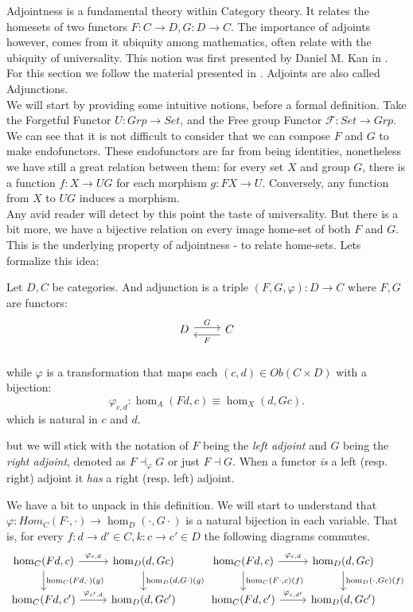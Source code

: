 Adjointness is a fundamental theory within Category theory. It relates the homesets of two functors $F:C\to D, G:D\to C$. The importance of adjoints however, comes from it ubiquity among mathematics, often relate with the ubiquity of universality. This notion was first presented by Daniel M. Kan in \cite{kan1958adjoint}. For this section we follow the material presented in \cite{mac2013categories}. Adjoints are also called Adjunctions.\\

We  will start by providing some intuitive notions, before a formal definition. Take the Forgetful Functor $U:Grp\to Set$, and the Free group Functor $\mathcal{F}:Set\to Grp$. We can see that it is not difficult to consider that we can compose $F$ and $G$ to make endofunctors. These endofunctors are far from being identities, nonetheless we have still a great relation between them: for every set $X$ and group $G$, there is a function $f: X \to UG$ for each morphism $g:FX\to U$. Conversely, any function from $X$ to $UG$ induces a morphism. \\

Any avid reader will detect by this point the taste of universality. But there is a bit more, we have a bijective relation on every image home-set of both $F$ and $G$. This is the underlying property of adjointness - to relate home-sets. Lets formalize this idea:
\begin{definition}
  Let $D,C$ be categories. And adjunction is a triple $(F,G,\varphi):D\to C$ where $F,G$ are functors:
  \[
    \begin{tikzcd}
      D\arrow[r, shift left=.5ex, "G"{name=F}] &
      C\arrow[l, shift left=1ex, "F"{name=G}] \\
    \end{tikzcd}
  \]
  while $\varphi$ is a transformation that maps each $(c,d) \in Ob(C\times D)$ with a bijection:
  \[
    \varphi_{c,d}:\hom_A(Fd, c)\equiv\hom_X(d, Gc).
  \]
  which is natural in $c$ and $d$. 
\end{definition}

\begin{remark}
  but we will stick with the notation of $F$ being the \emph{left adjoint} and $G$ being the \emph{right adjoint}, denoted as $F\dashv_\varphi G$ or just $F\dashv G$. When a functor \emph{is} a left (resp. right) adjoint it \emph{has} a right (resp. left) adjoint.\\
\end{remark}
We have a bit to unpack in this definition. We will start to understand that $\varphi:Hom_C(F\cdot, \cdot)\to \hom_D(\cdot, G\cdot)$ is a natural bijection in each variable. That is, for every $f:d\to d'\in C,k:c\to c' \in D$ the following diagrams commutes.
\[
\begin{tikzcd}
 \hom_C(Fd,c) \arrow{d}{\hom_C(Fd,\cdot)(g)}\arrow{r}{\varphi_{c,d}}
 &\hom_D(d,Gc)\arrow{d}{\hom_D(d,G\cdot)(g)}&
   \hom_C(Fd,c) \arrow{d}{\hom_C(F\cdot,c)(f)}\arrow{r}{\varphi_{c,d}}
    &\hom_D(d,Gc)\arrow{d}{\hom_D(\cdot,Gc)(f)}\\
 \hom_C(Fd,c') \arrow{r}{\varphi_{c',d}}  &\hom_D(d,Gc')&
    \hom_C(Fd,c') \arrow{r}{\varphi_{c,d'}}  &\hom_D(d,Gc')
  \end{tikzcd}
\]

